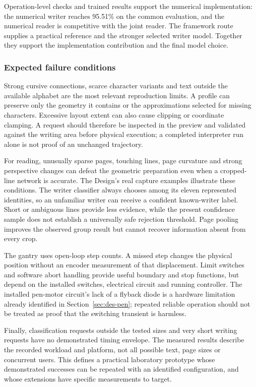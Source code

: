 Operation-level checks and trained results support the numerical implementation: the numerical writer reaches 95.51\% on the common evaluation, and the numerical reader is competitive with the joint reader. The framework route supplies a practical reference and the stronger selected writer model. Together they support the implementation contribution and the final model choice.

\subsubsection{Expected failure conditions}
\label{sec:dis-failures}
Strong cursive connections, scarce character variants and text outside the available alphabet are the most relevant reproduction limits. A profile can preserve only the geometry it contains or the approximations selected for missing characters. Excessive layout extent can also cause clipping or coordinate clamping. A request should therefore be inspected in the preview and validated against the writing area before physical execution; a completed interpreter run alone is not proof of an unchanged trajectory.

For reading, unusually sparse pages, touching lines, page curvature and strong perspective changes can defeat the geometric preparation even when a cropped-line network is accurate. The Design's real capture examples illustrate these conditions. The writer classifier always chooses among its eleven represented identities, so an unfamiliar writer can receive a confident known-writer label. Short or ambiguous lines provide less evidence, while the present confidence sample does not establish a universally safe rejection threshold. Page pooling improves the observed group result but cannot recover information absent from every crop.

The gantry uses open-loop step counts. A missed step changes the physical position without an encoder measurement of that displacement. Limit switches and software abort handling provide useful boundary and stop functions, but depend on the installed switches, electrical circuit and running controller. The installed pen-motor circuit's lack of a flyback diode is a hardware limitation already identified in Section~\ref{sec:des-pen}; repeated reliable operation should not be treated as proof that the switching transient is harmless.

Finally, classification requests outside the tested sizes and very short writing requests have no demonstrated timing envelope. The measured results describe the recorded workload and platform, not all possible text, page sizes or concurrent users. This defines a practical laboratory prototype whose demonstrated successes can be repeated with an identified configuration, and whose extensions have specific measurements to target.

